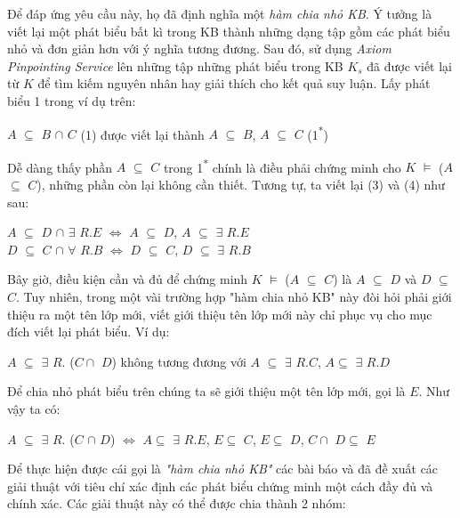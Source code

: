		\hspace*{0.05\textwidth} Để đáp ứng yêu cầu này, họ đã định nghĩa một \textit{hàm chia nhỏ KB}. Ý tưởng là viết lại một phát biểu bất kì trong KB thành những dạng tập gồm các phát biểu nhỏ và đơn giản hơn với ý nghĩa  tương đương. Sau đó, sử dụng \textit{Axiom Pinpointing Service} lên những tập những phát biểu trong KB $K_{s}$ đã được viết lại từ $K$ để tìm kiếm nguyên nhân hay giải thích cho kết quả suy luận. Lấy phát biểu 1 trong ví dụ trên:
		\begin{center}
			$A$ $\subseteq$ $B$ $\cap$ $C$ (1) được viết lại thành $A$ $\subseteq$ $B$, $A$ $\subseteq$ $C$ (1\textsuperscript{*})
		\end{center}
		Dễ dàng thấy phần $A$ $\subseteq$ $C$ trong 1\textsuperscript{*} chính là điều phải chứng minh cho $K$ $\models$ ($A$ $\subseteq$ $C$), những phần còn lại không cần thiết. Tương tự, ta viết lại (3) và (4) như sau:
		\begin{center}
			$A$ $\subseteq$ $D$ $\cap$ $\exists$ $R.E$  $\Leftrightarrow$ $A$ $\subseteq$ $D$, $A$ $\subseteq$ $\exists$ $R.E$
			\\
			$D$ $\subseteq$ $C$ $\cap$ $\forall$ $R.B$ $\Leftrightarrow$ $D$ $\subseteq$ $C$, $D$ $\subseteq$ $\exists$ $R.B$
		\end{center}
		Bây giờ, điều kiện cần và đủ để chứng minh $K$ $\models$ ($A$ $\subseteq$ $C$) là $A$ $\subseteq$ $D$ và $D$ $\subseteq$ $C$. Tuy nhiên, trong một vài trường hợp "hàm chia nhỏ KB" này đòi hỏi phải giới thiệu ra một tên lớp mới, viết giới thiệu tên lớp mới này chỉ phục vụ cho mục đích viết lại phát biểu. Ví dụ:	
		\begin{center}
			$A$ $\subseteq$ $\exists$ $R.$ ($C\cap$ $D$) không tương đương với $A$ $\subseteq$ $\exists$ $R.C$, $A\subseteq$ $\exists$ $R.D$
		\end{center}
		Để chia nhỏ phát biểu trên chúng ta sẽ giới thiệu một tên lớp mới, gọi là $E$.	Như vậy ta có:
		\begin{center}
			$A$ $\subseteq$ $\exists$ $R.$ ($C$ $\cap$ $D$) $\Leftrightarrow$ $A\subseteq$ $\exists$ $R.E$, $E\subseteq$ $C$, $E\subseteq$ $D$, $C\cap$ $D\subseteq$ $E$
		\end{center}
		Để thực hiện được cái gọi là \textit{"hàm chia nhỏ KB"} các bài báo \cite{repair} và \cite{axiomPinpoint} đã đề xuất các giải thuật với tiêu chí xác định các phát biểu chứng minh một cách đầy đủ và chính xác. Các giải thuật này có thể được chia thành 2 nhóm:
